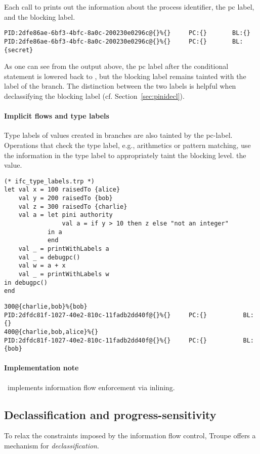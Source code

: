 Each call to  prints out the information about the process identifier,
the pc label, and the blocking label.
\begin{verbatim}
PID:2dfe86ae-6bf3-4bfc-8a0c-200230e0296c@{}%{}     PC:{}       BL:{}                
PID:2dfe86ae-6bf3-4bfc-8a0c-200230e0296c@{}%{}     PC:{}       BL:{secret}           
\end{verbatim}
As one can see from the output above, the pc label after the conditional
statement is lowered back to \lev{}, but the blocking label remains tainted 
with the label of the branch. The distinction between the two labels
is helpful when declassifying the blocking label (cf. Section~\ref{sec:pinidecl}).



\paragraph{Implicit flows and type labels}
Type labels of values created in branches are also tainted by the pc-label.
Operations that check the type label, e.g., arithmetics or pattern
matching, use the information in the type label to appropriately taint the blocking level.
the value.
\begin{lstlisting}
(* ifc_type_labels.trp *)
let val x = 100 raisedTo {alice}
    val y = 200 raisedTo {bob}
    val z = 300 raisedTo {charlie}
    val a = let pini authority 
                val a = if y > 10 then z else "not an integer"
            in a 
            end
    val _ = printWithLabels a
    val _ = debugpc()
    val w = a + x
    val _ = printWithLabels w
in debugpc()
end
\end{lstlisting}
\begin{verbatim}
300@{charlie,bob}%{bob}
PID:2dfdc81f-1027-40e2-810c-11fadb2dd40f@{}%{}     PC:{}          BL:{}
400@{charlie,bob,alice}%{}
PID:2dfdc81f-1027-40e2-810c-11fadb2dd40f@{}%{}     PC:{}          BL:{bob}
\end{verbatim}


\paragraph{Implementation note}
\troupelang\ implements information flow enforcement via inlining.



\subsection{Declassification and progress-sensitivity}
\label{sec:declassification}
To relax the constraints imposed by the information flow control, Troupe offers 
a mechanism for \emph{declassification}. 
